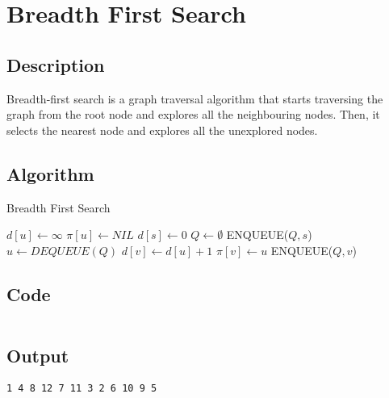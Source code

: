 \section{Breadth First Search}

\subsection{Description}
Breadth-first search is a graph traversal algorithm that starts traversing the graph from the root node and explores all
the neighbouring nodes. Then, it selects the nearest node and explores all the unexplored nodes.

\subsection{Algorithm}


\begin{algorithm}[H]
    \caption{Breadth First Search}
    \begin{algorithmic}[1]
        \State $d[u] \gets \infty$
        \State $\pi[u] \gets NIL$
        \EndFor
        \State $d[s] \gets 0$
        \State $Q \gets \emptyset$
        \State ENQUEUE($Q, s$)
        \State $u \gets DEQUEUE(Q)$
        \State $d[v] \gets d[u] + 1$
        \State $\pi[v] \gets u$
        \State ENQUEUE($Q, v$)
        \EndIf
        \EndFor
        \EndWhile
        \EndProcedure
    \end{algorithmic}
\end{algorithm}

\subsection{Code}

\inputminted[fontsize=\footnotesize,bgcolor=bg,linenos,autogobble,frame=single,framerule=0.01pt,rulecolor=FSBorder,stripall,breaklines]{c++}{code/bfs.cpp}

\subsection{Output}

\begin{lstlisting}[style=output]
    1 4 8 12 7 11 3 2 6 10 9 5
\end{lstlisting}